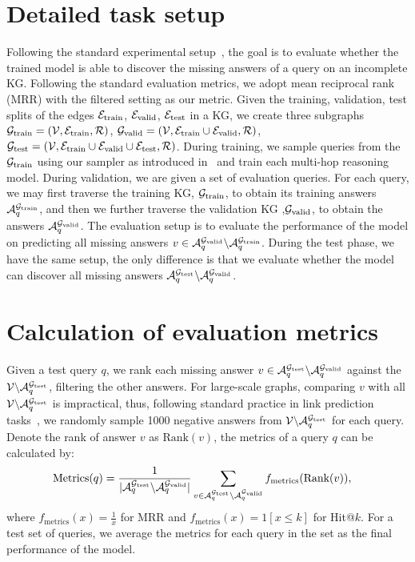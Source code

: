 \section{Detailed task setup}\label{app:task-setup}
Following the standard experimental setup~\citep{ren2020query2box,ren2020beta}, the goal is to evaluate whether the trained model is able to discover the missing answers of a query on an incomplete KG.
Following the standard evaluation metrics, we adopt mean reciprocal rank (MRR) with the filtered setting as our metric. 
Given the training, validation, test splits of the edges $\mathcal{E}_\text{train}$, $\mathcal{E}_\text{valid}$, $\mathcal{E}_\text{test}$ in a KG, we create three subgraphs $\mathcal{G}_\text{train}=(\mathcal{V}, \mathcal{E}_\text{train}, \mathcal{R})$, $\mathcal{G}_\text{valid}=(\mathcal{V}, \mathcal{E}_\text{train}\cup\mathcal{E}_\text{valid}, \mathcal{R})$, $\mathcal{G}_\text{test}=(\mathcal{V}, \mathcal{E}_\text{train}\cup\mathcal{E}_\text{valid}\cup\mathcal{E}_\text{test},\mathcal{R})$. During training, we sample queries from the $\mathcal{G}_\text{train}$ using our sampler as introduced in~ and train each multi-hop reasoning model. During validation, we are given a set of evaluation queries. For each query, we may first traverse the training KG, $\mathcal{G}_\text{train}$, to obtain its training answers $\mathcal{A}_q^{\mathcal{G}_\text{train}}$, and then we further traverse the validation KG ,$\mathcal{G}_\text{valid}$, to obtain the answers $\mathcal{A}_q^{\mathcal{G}_\text{valid}}$. The evaluation setup is to evaluate the performance of the model on predicting all missing answers $v\in\mathcal{A}_q^{\mathcal{G}_\text{valid}}\backslash\mathcal{A}_q^{\mathcal{G}_\text{train}}$. During the test phase, we have the same setup, the only difference is that we evaluate whether the model can discover all missing answers $\mathcal{A}_q^{\mathcal{G}_\text{test}}\backslash \mathcal{A}_q^{\mathcal{G}_\text{valid}}$.%

\section{Calculation of evaluation metrics}\label{app:metrics}
Given a test query $q$, we rank each missing answer $v\in\mathcal{A}_q^{\mathcal{G}_\text{test}}\backslash \mathcal{A}_q^{\mathcal{G}_\text{valid}}$ against the $\mathcal{V} \backslash\mathcal{A}_q^{\mathcal{G}_\text{test}}$, filtering the other answers. For large-scale graphs, comparing $v$ with all $\mathcal{V} \backslash\mathcal{A}_q^{\mathcal{G}_\text{test}}$ is impractical, thus, following standard practice in link prediction tasks~\citep{zheng2020dgl}, we randomly sample 1000 negative answers from $\mathcal{V} \backslash\mathcal{A}_q^{\mathcal{G}_\text{test}}$ for each query. Denote the rank of answer $v$ as $\text{Rank}(v)$, the metrics of a query $q$ can be calculated by:
\begin{align}%
    &\text{Metrics}(q) = \frac{1}{|\Acal_q^{\Gcal_\text{test}}\backslash \Acal_q^{\Gcal_\text{valid}}|} \sum_{v \in \Acal_q^{\Gcal_\text{test}}\backslash \Acal_q^{\Gcal_\text{valid}}} f_{\text{metrics}}(\text{Rank}(v)), \nonumber
\end{align}
where $f_\text{metrics}(x)=\frac{1}{x}$ for MRR and $f_\text{metrics}(x)=1[x\leq k]$ for Hit@$k$. For a test set of queries, we average the metrics for each query in the set as the final performance of the model.


